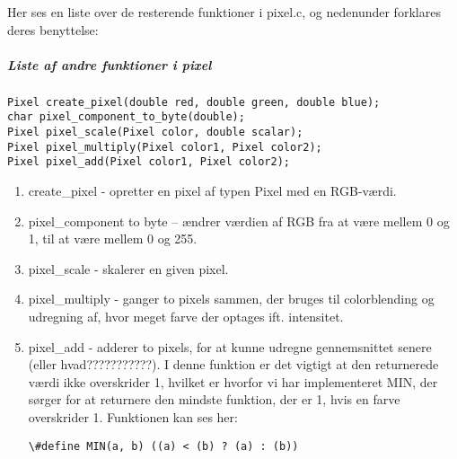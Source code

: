 Her ses en liste over de resterende funktioner i pixel.c, og nedenunder forklares deres benyttelse:

\subparagraph{Liste af andre funktioner i pixel}
\begin{lstlisting}[style=Cstyle, caption=Andre funktioner i pixel]
Pixel create_pixel(double red, double green, double blue);
char pixel_component_to_byte(double);
Pixel pixel_scale(Pixel color, double scalar);
Pixel pixel_multiply(Pixel color1, Pixel color2);
Pixel pixel_add(Pixel color1, Pixel color2);
\end{lstlisting}

\begin{enumerate}

  \item create\_pixel - opretter en pixel af typen Pixel med en RGB-værdi.
  \item pixel\_component to byte – ændrer værdien af RGB fra at være mellem 0 og 1, til at være mellem 0 og 255.
  \item pixel\_scale - skalerer en given pixel.
  \item pixel\_multiply - ganger to pixels sammen, der bruges til colorblending og udregning af, hvor meget farve der optages 								  ift. intensitet.
  \item pixel\_add - adderer to pixels, for at kunne udregne gennemsnittet senere (eller hvad???????????). I denne funktion er 							 det vigtigt at den returnerede værdi ikke overskrider 1, hvilket er hvorfor vi har implementeret MIN, der 							 sørger for at returnere den mindste funktion, der er 1, hvis en farve overskrider 1. Funktionen kan ses her:
  
 \lstinline$\#define MIN(a, b) ((a) < (b) ? (a) : (b))$  					

\end{enumerate}

